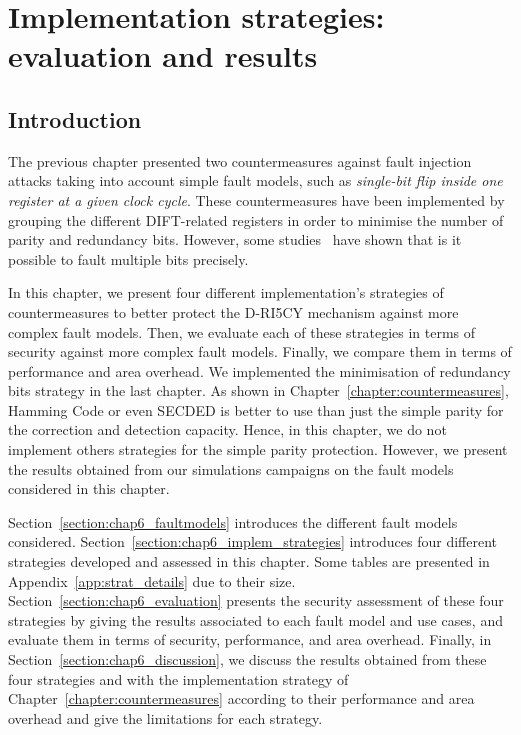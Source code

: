 \chapter{Implementation strategies: evaluation and results}
\label{chapter:exp_setup_results}
\minitoc

\section{Introduction}
The previous chapter presented two countermeasures against fault injection attacks taking into account simple fault models, such as \textit{single-bit flip inside one register at a given clock cycle}. These countermeasures have been implemented by grouping the different DIFT-related registers in order to minimise the number of parity and redundancy bits. However, some studies~\cite{CGVCBLC-22-cardis,VDSPB-24-jce} have shown that is it possible to fault multiple bits precisely.

In this chapter, we present four different implementation's strategies of countermeasures to better protect the D-RI5CY mechanism against more complex fault models. Then, we evaluate each of these strategies in terms of security against more complex fault models. Finally, we compare them in terms of performance and area overhead. We implemented the minimisation of redundancy bits strategy in the last chapter. As shown in Chapter~\ref{chapter:countermeasures}, Hamming Code or even SECDED is better to use than just the simple parity for the correction and detection capacity. Hence, in this chapter, we do not implement others strategies for the simple parity protection. However, we present the results obtained from our simulations campaigns on the fault models considered in this chapter.

Section~\ref{section:chap6_faultmodels} introduces the different fault models considered.
Section~\ref{section:chap6_implem_strategies} introduces four different strategies developed and assessed in this chapter. Some tables are presented in Appendix~\ref{app:strat_details} due to their size.
Section~\ref{section:chap6_evaluation} presents the security assessment of these four strategies by giving the results associated to each fault model and use cases, and evaluate them in terms of security, performance, and area overhead.
Finally, in Section~\ref{section:chap6_discussion}, we discuss the results obtained from these four strategies and with the implementation strategy of Chapter~\ref{chapter:countermeasures} according to their performance and area overhead and give the limitations for each strategy.

